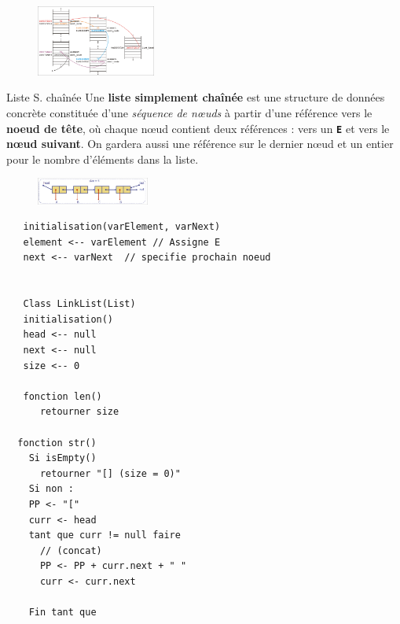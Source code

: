 \documentclass{report}
\begin{document}
\begin{multicols*}{3}
  \begin{figure}[H]
    \begin{center}
      \includegraphics[width=0.35\textwidth]{ExempleListeChaine.png}
    \end{center}
  \end{figure}


  \begin{Definitionx}{Liste S. chaînée}{}
    Une \textbf{liste simplement chaînée} est une structure 
    de données concrète 
    constituée d'une \textit{séquence de nœuds} à partir
    d'une référence vers 
    le \textbf{noeud de tête}, où chaque nœud 
    contient deux références : 
    vers un \texttt{\textbf{E}}   et vers le \textbf{nœud suivant}. 
    On gardera aussi une référence sur le dernier 
    nœud et un entier 
    pour le nombre d’éléments dans la liste.     
  \end{Definitionx}

  \begin{figure}[H]
    \begin{center}
      \includegraphics[width=0.33\textwidth]{ListeSChainee.png}
    \end{center}
  \end{figure}



  \begin{lstlisting}
   initialisation(varElement, varNext)
   element <-- varElement // Assigne E
   next <-- varNext  // specifie prochain noeud


   Class LinkList(List) 
   initialisation()
   head <-- null 
   next <-- null 
   size <-- 0

   fonction len() 
      retourner size 

  fonction str() 
    Si isEmpty() 
      retourner "[] (size = 0)"
    Si non : 
    PP <- "["
    curr <- head 
    tant que curr != null faire 
      // (concat)
      PP <- PP + curr.next + " " 
      curr <- curr.next

    Fin tant que 


\end{lstlisting}
\end{multicols*}
\end{document}
